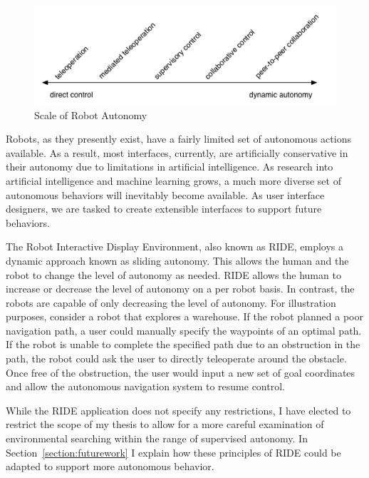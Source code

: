 \begin{figure}[ht]
\begin{center}
\includegraphics[width=5in]{images/autonomy.png}
\caption{Scale of Robot Autonomy\label{fig:autonomy}}
\end{center}
\end{figure}

Robots, as they presently exist, have a fairly limited set of autonomous actions available. As a result, most interfaces, currently, are artificially conservative in their autonomy due to limitations in artificial intelligence. As research into artificial intelligence and machine learning grows, a much more diverse set of autonomous behaviors will inevitably become available. As user interface designers, we are tasked to create extensible interfaces to support future behaviors.

The Robot Interactive Display Environment, also known as RIDE, employs a dynamic approach known as sliding autonomy. This allows the human and the robot to change the level of autonomy as needed. RIDE allows the human to increase or decrease the level of autonomy on a per robot basis. In contrast, the robots are capable of only decreasing the level of autonomy. For illustration purposes, consider a robot that explores a warehouse. If the robot planned a poor navigation path, a user could manually specify the waypoints of an optimal path. If the robot is unable to complete the specified path due to an obstruction in the path, the robot could ask the user to directly teleoperate around the obstacle. Once free of the obstruction, the user would input a new set of goal coordinates and allow the autonomous navigation system to resume control.

While the RIDE application does not specify any restrictions, I have elected to restrict the scope of my thesis to allow for a more careful examination of environmental searching within the range of supervised autonomy. In Section~\ref{section:futurework} I explain how these principles of RIDE could be adapted to support more autonomous behavior.

